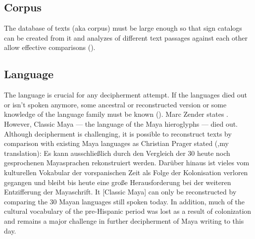 \documentclass[../main.tex]{subfiles}
\begin{document}
\subsection{Corpus}
The database of texts (aka corpus) must be large enough so that sign catalogs can be created from it 
and analyzes of different text passages against each other allow effective comparisons 
(\cites[2]{zender2017}[44]{coe1992}).

\subsection{Language}
The language is crucial for any decipherment attempt.
If the languages died out or isn't spoken anymore, some ancestral or reconstructed 
version or some knowledge of the language family must be known (\cite[44]{coe1992}).
Marc Zender states .
However, Classic Maya --- the language of the Maya hieroglyphs ---  died out.
Although decipherment is challenging, it is possible to reconstruct texts by comparison 
with existing Maya languages as Christian Prager stated (\cite[6]{prager2018},my translation): 
{
    Es kann ausschließlich durch den Vergleich der 30 heute noch 
    gesprochenen Mayasprachen rekonstruiert werden. 
    Darüber hinaus ist vieles vom kulturellen Vokabular der vorspanischen Zeit als Folge der 
    Kolonisation verloren gegangen und bleibt bis heute eine große Herausforderung bei der 
    weiteren Entzifferung der Mayaschrift.
}
{
    It [Classic Maya] can only be reconstructed by comparing the 30 Mayan languages still 
    spoken today. 
    In addition, much of the cultural vocabulary of the pre-Hispanic period was lost as a result of 
    colonization and remains a major challenge in further decipherment of Maya writing 
    to this day.
}
\end{document}
